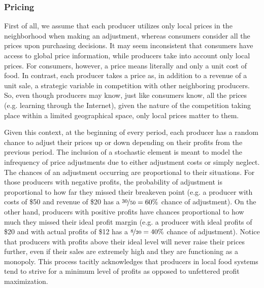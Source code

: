 \documentclass[11pt, oneside]{article}
\begin{document}
\subsubsection{Pricing}
First of all, we assume that each producer utilizes only local prices in the neighborhood when making an adjustment, whereas consumers consider all the prices upon purchasing decisions. It may seem inconsistent that consumers have access to global price information, while producers take into account only local prices. For consumers, however, a price means literally and only a unit cost of food. In contrast, each producer takes a price as, in addition to a revenue of a unit sale, a strategic variable in competition with other neighboring producers. So, even though producers may know, just like consumers know, all the prices (e.g. learning through the Internet), given the nature of the competition taking place within a limited geographical space, only local prices matter to them.

Given this context, at the beginning of every period, each producer has a random chance to adjust their prices up or down depending on their profits from the previous period. The inclusion of a stochastic element is meant to model the infrequency of price adjustments due to either adjustment costs or simply neglect. The chances of an adjustment occurring are proportional to their situations. For those producers with negative profits, the probability of adjustment is proportional to how far they missed their breakeven point (e.g. a producer with costs of \$50 and revenue of \$20 has a $\nicefrac{30}{50}=60\%$ chance of adjustment). On the other hand, producers with positive profits have chances proportional to how much they missed their ideal profit margin (e.g. a producer with ideal profits of \$20 and with actual profits of \$12 has a $\nicefrac{8}{20}=40\%$ chance of adjustment). Notice that producers with profits above their ideal level will never raise their prices further, even if their sales are extremely high and they are functioning as a monopoly. This process tacitly acknowledges that producers in local food systems tend to strive for a minimum level of profits as opposed to unfettered profit maximization.
\end{document}
